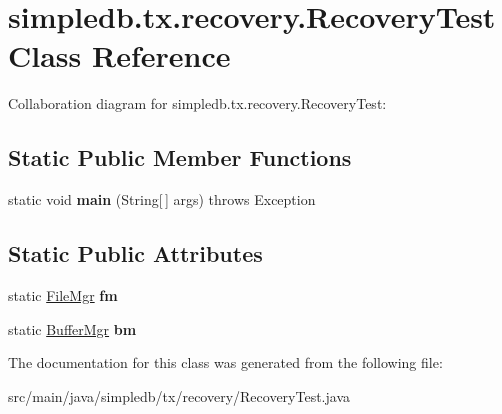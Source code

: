 \hypertarget{classsimpledb_1_1tx_1_1recovery_1_1RecoveryTest}{}\section{simpledb.\+tx.\+recovery.\+Recovery\+Test Class Reference}
\label{classsimpledb_1_1tx_1_1recovery_1_1RecoveryTest}


Collaboration diagram for simpledb.\+tx.\+recovery.\+Recovery\+Test\+:
\subsection*{Static Public Member Functions}
\begin{DoxyCompactItemize}
\item 
\mbox{\label{classsimpledb_1_1tx_1_1recovery_1_1RecoveryTest_aa94b4462b6ac27ec5b268e026b3d7616}} 
static void {\bfseries main} (String\mbox{[}$\,$\mbox{]} args)  throws Exception 
\end{DoxyCompactItemize}
\subsection*{Static Public Attributes}
\begin{DoxyCompactItemize}
\item 
\mbox{\label{classsimpledb_1_1tx_1_1recovery_1_1RecoveryTest_a692d8a22aeb9b1061e36356aea1124dc}} 
static \hyperlink{classsimpledb_1_1file_1_1FileMgr}{File\+Mgr} {\bfseries fm}
\item 
\mbox{\label{classsimpledb_1_1tx_1_1recovery_1_1RecoveryTest_ad145cbba72de08d515fece5c1e5164a4}} 
static \hyperlink{classsimpledb_1_1buffer_1_1BufferMgr}{Buffer\+Mgr} {\bfseries bm}
\end{DoxyCompactItemize}


The documentation for this class was generated from the following file\+:\begin{DoxyCompactItemize}
\item 
src/main/java/simpledb/tx/recovery/Recovery\+Test.\+java\end{DoxyCompactItemize}
